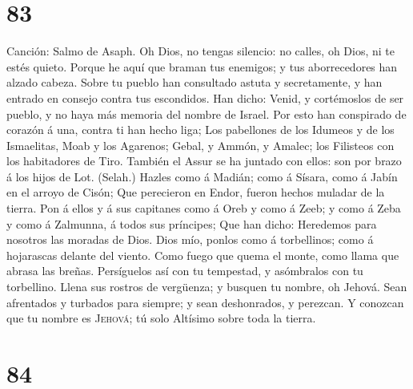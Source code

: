 \hypertarget{section-82}{%
\section{83}\label{section-82}}

 Canción: Salmo de Asaph. Oh Dios, no tengas silencio: no
calles, oh Dios, ni te estés quieto.  Porque he aquí que
braman tus enemigos; y tus aborrecedores han alzado cabeza.
 Sobre tu pueblo han consultado astuta y secretamente, y
han entrado en consejo contra tus escondidos.  Han dicho:
Venid, y cortémoslos de ser pueblo, y no haya más memoria del nombre de
Israel.  Por esto han conspirado de corazón á una, contra
ti han hecho liga;  Los pabellones de los Idumeos y de los
Ismaelitas, Moab y los Agarenos;  Gebal, y Ammón, y
Amalec; los Filisteos con los habitadores de Tiro. 
También el Assur se ha juntado con ellos: son por brazo á los hijos de
Lot. (Selah.)  Hazles como á Madián; como á Sísara, como á
Jabín en el arroyo de Cisón;  Que perecieron en Endor,
fueron hechos muladar de la tierra.  Pon á ellos y á sus
capitanes como á Oreb y como á Zeeb; y como á Zeba y como á Zalmunna, á
todos sus príncipes;  Que han dicho: Heredemos para
nosotros las moradas de Dios.  Dios mío, ponlos como á
torbellinos; como á hojarascas delante del viento.  Como
fuego que quema el monte, como llama que abrasa las breñas.
 Persíguelos así con tu tempestad, y asómbralos con tu
torbellino.  Llena sus rostros de vergüenza; y busquen tu
nombre, oh Jehová.  Sean afrentados y turbados para
siempre; y sean deshonrados, y perezcan.  Y conozcan que
tu nombre es \textsc{Jehová}; tú solo Altísimo sobre toda la tierra.

\hypertarget{section-83}{%
\section{84}\label{section-83}}

